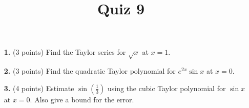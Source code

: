 \documentclass[12pt]{amsart}
\title{Quiz 9}
\begin{document}
\maketitle
\thispagestyle{fancy}

\vskip0.25in
\begin{enumerate}


\item[\textbf{1. }] (3 points) Find the Taylor series for $\sqrt{x}$ at $x = 1$.

\vskip 2in

\item[\textbf{2. }](3 points) Find the quadratic Taylor polynomial for $e^{2x} \sin x$ at $x = 0$.
 
\vskip 2in

\item[\textbf{3. }] (4 points) Estimate $\sin(\frac 1 3)$ using the cubic Taylor polynomial for $\sin x$ at $x = 0$.  Also give a bound for the error.

\end{enumerate}
\end{document}
